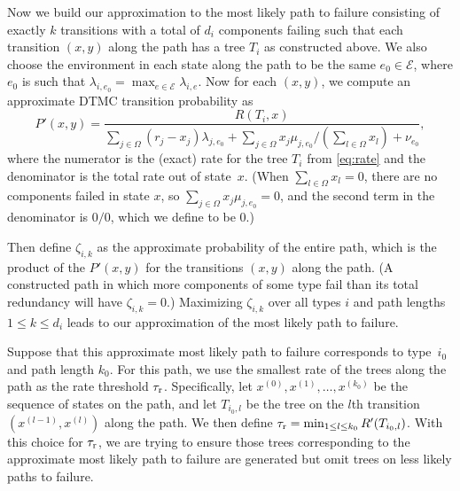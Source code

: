 \documentclass[12pt]{article}
\def\myxoutii{\bgroup \markoverwith{\textcolor{blue}{\hbox to.35em{\hss/\hss}}}\ULon}
\newcommand{\changed}[1]{#1}
\newcommand{\deletedii}[1]{}
\newcommand{\changedii}[1]{#1}
\newcommand{\changed}[1]{\textcolor{red}{#1}}
\newcommand{\changedii}[1]{\textcolor{blue}{#1}}
\newcommand{\deletedii}[1]{{\myxoutii{#1}}}
\begin{document}
\changed{Now we build our approximation
to the most likely path to failure
consisting of exactly $k$ transitions with a
total of $d_{i}$ components failing such
that each transition $(x,y)$ along the path has a
tree $T_{i}$ as constructed above.
We also choose the environment in each
state along the path to be the
same $e_0 \in \mathcal{E}$,
where $e_0$ is such that
$\lambda_{i, e_0}
= \max_{e \in \mathcal{E}} \lambda_{i, e}$.
Now for each $(x,y)$, we compute an
approximate DTMC transition probability
as
$$
P'(x,y) = \frac{R(T_i,x)}
{\sum_{j \in \Omega} (r_j - x_j) \lambda_{j, e_0}
+ \sum_{j \in \Omega} x_j \mu_{j,e_0}/
(\sum_{l \in \Omega} x_l)
\changedii{+ \nu_{e_0}}},
$$
where the numerator is the
(exact) rate for the tree $T_i$
from \eqref{eq:rate}
and the denominator is the total rate
out of state~$x$.
\changedii{(When $\sum_{l \in \Omega} x_l = 0$,
there are no components failed in state $x$,
so $\sum_{j \in \Omega} x_j \mu_{j,e_0} = 0$,
and the second term in the denominator
is $0/0$, which we define to be $0$.)}
}

\changed{
Then define $\zeta_{i, k}$ as
the approximate probability of the entire
path, which is the product of the $P'(x,y)$
for the transitions $(x,y)$ along the path.
\changedii{(A constructed path in which
more components of some type fail
than its total redundancy
will have $\zeta_{i,k} = 0$.)}
Maximizing $\zeta_{i,k}$ over all types $i$
and path lengths $1 \leq k \leq d_{i}$
leads to our approximation of
the most likely path to failure.
}


\changed{
Suppose that this approximate
most likely path to failure
corresponds to type~$i_0$
and path length $k_0$.
For this path,
we \deletedii{now want to} use the smallest rate
of the trees along the path as the rate
threshold $\tau_{\textrm r}$.
Specifically, let $x^{(0)}, x^{(1)},
\ldots, x^{(k_0)}$ be the sequence
of states on the path,
and let $T_{i_0,l}$ be the
tree on the $l$th
transition $(x^{(l-1)}, x^{(l)})$
along the path.
We then define
$\tau_{\textrm r} = \min_{1 \leq l \leq k_0}
R'(T_{i_0,l})$.
With this choice for $\tau_{\textrm r}$,
we are trying
to ensure those trees
corresponding
to the approximate most likely path to failure
are generated but omit trees
on less likely paths to failure.
}
\end{document}
